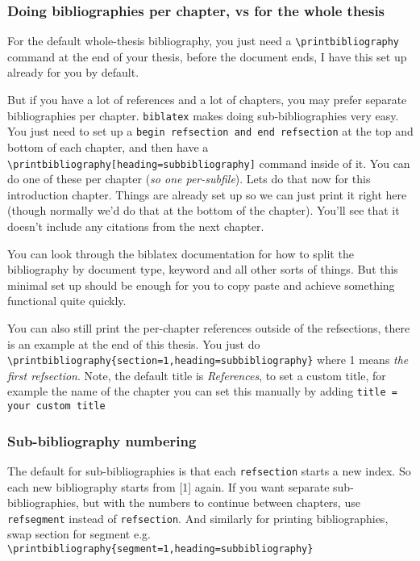 \documentclass[../HWThesis.tex]{subfiles} %
\begin{document}
\begin{refsection}
\subsubsection{Doing bibliographies per chapter, vs for the whole thesis}

For the default whole-thesis bibliography, you just need a  \texttt{\textbackslash printbibliography} command at the end of your thesis, before the document ends, I have this set up already for you by default. 

But if you have a lot of references and a lot of chapters, you may prefer separate bibliographies per chapter. \texttt{biblatex} makes doing sub-bibliographies very easy. You just need to set up a \texttt{begin refsection and end refsection} at the top and bottom of each chapter, and then have a \texttt{\textbackslash printbibliography[heading=subbibliography]} command inside of it. You can do one of these per chapter (\textit{so one per-subfile}). Lets do that now for this introduction chapter. Things are already set up so we can just print it right here (though normally we'd do that at the bottom of the chapter). You'll see that it doesn't include any citations from the next chapter.  \cite{gum2, Talia01} 

You can look through the biblatex documentation for how to split the bibliography by document type, keyword and all other sorts of things. But this minimal set up should be enough for you to copy paste and achieve something functional quite quickly.

You can also still print the per-chapter references outside of the refsections, there is an example at the end of this thesis. 
You just do \\ \texttt{\textbackslash printbibliography\{section=1,heading=subbibliography\}} where 1 means \textit{the first refsection}. Note, the default title is \textit{References}, to set a custom title, for example the name of the chapter you can set this manually by adding \texttt{title = your custom title}

\subsubsection{Sub-bibliography numbering}

The default for sub-bibliographies is that each \texttt{refsection} starts a new index. So each new bibliography starts from [1] again. 
If you want separate sub-bibliographies, but with the numbers to continue between chapters, use \texttt{refsegment} instead of \texttt{refsection}. And similarly for printing bibliographies, swap section for segment e.g. \texttt{\textbackslash printbibliography\{segment=1,heading=subbibliography\}}


\end{refsection}
\end{document}
